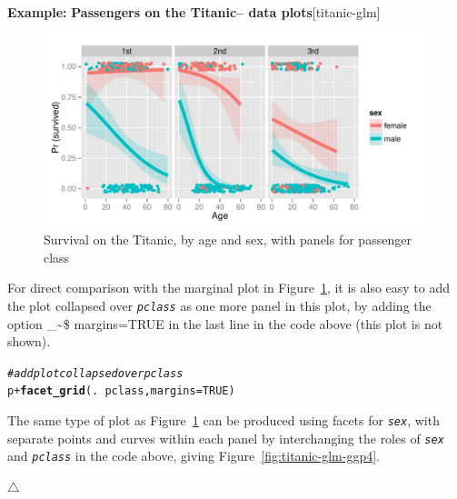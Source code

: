 \documentclass{article}
\makeatletter
\newcommand{\hlnum}[1]{\textcolor[rgb]{0.686,0.059,0.569}{#1}}%
\newcommand{\hlcom}[1]{\textcolor[rgb]{0.678,0.584,0.686}{\textit{#1}}}%
\newcommand{\hlopt}[1]{\textcolor[rgb]{0,0,0}{#1}}%
\newcommand{\hlstd}[1]{\textcolor[rgb]{0.345,0.345,0.345}{#1}}%
\newcommand{\hlkwc}[1]{\textcolor[rgb]{0.333,0.667,0.333}{#1}}%
\newcommand{\hlkwd}[1]{\textcolor[rgb]{0.737,0.353,0.396}{\textbf{#1}}}%
\newenvironment{kframe}{%
 \def\at@end@of@kframe{}%
 \ifinner\ifhmode%
  \def\at@end@of@kframe{\end{minipage}}%
  \begin{minipage}{\columnwidth}%
 \fi\fi%
 \def\FrameCommand##1{\hskip\@totalleftmargin \hskip-\fboxsep
 \colorbox{shadecolor}{##1}\hskip-\fboxsep
     \hskip-\linewidth \hskip-\@totalleftmargin \hskip\columnwidth}%
 \MakeFramed {\advance\hsize-\width
   \@totalleftmargin\z@ \linewidth\hsize
   \@setminipage}}%
 {\par\unskip\endMakeFramed%
 \at@end@of@kframe}
\newenvironment{knitrout}{}{} %
\newcommand{\figref}[1]{Figure~\ref{#1}}
\newcommand{\var}[1]{\textit{\texttt{#1}}}
\newcommand\code{\bgroup\@makeother\_\@makeother\~\@makeother\$\@codex}
\def\@codex#1{{\normalfont\ttfamily\hyphenchar\font=-1 #1}\egroup}
\newenvironment{Example}[2][unnamed-example]%
  {\medskip\noindent\textbf{\textsf{Example:}}
   \textbf{#2}\hfill [#1]\par\smallskip
  }
  {\hfill $\triangle$}
\makeatother
\begin{document}
\begin{Example}[titanic-glm]{Passengers on the Titanic-- data plots}
\begin{knitrout}
\begin{figure}[hb]
{\centering \includegraphics[width=\linewidth]{figure/titanic-glm-ggp3-1} 

}

\caption[Survival on the Titanic, by age and sex, with panels for passenger class]{Survival on the Titanic, by age and sex, with panels for passenger class}\label{fig:titanic-glm-ggp3}
\end{figure}


\end{knitrout}

For direct comparison with the marginal plot in
\figref{fig:titanic-glm-ggp3}, it is also easy to add the
plot collapsed over \var{pclass} as one more panel in this plot,
by adding the option \code{margins=TRUE}
in the last line in the code above (this plot is not shown).

\begin{knitrout}
\color{fgcolor}\begin{kframe}
\begin{alltt}
\hlcom{# add plot collapsed over pclass}
\hlstd{p} \hlopt{+} \hlkwd{facet_grid}\hlstd{(.} \hlopt{~} \hlstd{pclass,} \hlkwc{margins}\hlstd{=}\hlnum{TRUE}\hlstd{)}
\end{alltt}
\end{kframe}
\end{knitrout}

The same type of plot as \figref{fig:titanic-glm-ggp3}
can be produced using facets for \var{sex}, with
separate points and curves within each panel by interchanging
the roles of \var{sex} and \var{pclass} in the code above,
giving \figref{fig:titanic-glm-ggp4}.


\end{Example}
\end{document}
